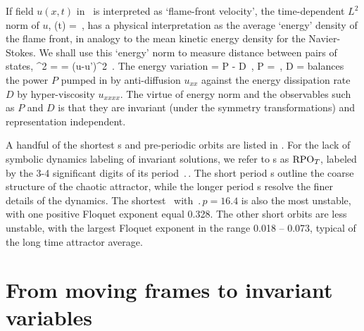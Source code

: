 \documentclass[aip,cha,showpacs,reprint]{revtex4-1} %
\begin{document}
If field $u(x,t)$ in \KSe\  is interpreted as
`flame-front velocity', the time-dependent $L^2$ norm
of $u$,
\beq
  \expctE(t) = \Lint{\pSpace} 
  \,,
  \label{ksEnergy}
\eeq
has a physical interpretation as the average `energy'
density of the flame front, in analogy to the mean kinetic energy
density for the Navier-Stokes.
We shall use this `energy' norm to measure distance between pairs of states,
\beq
  ^2  =  =
\Lint{\pSpace} ({u}-{u}')^2
\,.
\label{KSnorm} \eeq
The energy variation
\beq
   \dot{\expctE} = P - D
                \,,\qquad
      P =  
                \,,\quad
      D =  
\label{EnRate} \eeq
balances the power $P$ pumped in by anti-diffusion $u_{xx}$ against the
energy dissipation rate $D$ by hyper-viscosity $u_{xxxx}$. The virtue of
energy norm  and the observables such as $P$ and $D$ is
that they are invariant (under the  symmetry transformations) and
representation independent.

A handful of the shortest \rpo s and pre-periodic orbits are listed in
    .
For the lack of symbolic dynamics labeling of invariant solutions, we
refer to \rpo s as $\mathrm{RPO}_{{T_{}}}$, labeled by the 3-4
significant digits of its period $\period{}$.
The short period \rpo s outline the coarse structure of the chaotic
attractor, while the longer period \rpo s resolve the finer details
of the dynamics. The shortest \rpo\ with
$\period{p} = 16.4$ is also the most unstable, with one positive
Floquet exponent equal 0.328.  The other short orbits are less
unstable, with the largest Floquet exponent in the range
0.018 -- 0.073, typical of the long time attractor average.


\section{From moving frames to invariant variables}
\end{document}
